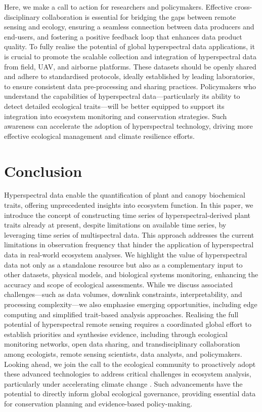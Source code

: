 \documentclass[pdflatex,sn-mathphys-num]{sn-jnl}%
\theoremstyle{thmstyleone}%
\theoremstyle{thmstyletwo}%
\theoremstyle{thmstylethree}%
\begin{document}
Here, we make a call to action for researchers and policymakers. Effective cross-disciplinary collaboration is essential for bridging the gaps between remote sensing and ecology, ensuring a seamless connection between data producers and end-users, and fostering a positive feedback loop that enhances data product quality. To fully realise the potential of global hyperspectral data applications, it is crucial to promote the scalable collection and integration of hyperspectral data from field, UAV, and airborne platforms. These datasets should be openly shared and adhere to standardised protocols, ideally established by leading laboratories, to ensure consistent data pre-processing and sharing practices. Policymakers who understand the capabilities of hyperspectral data—particularly its ability to detect detailed ecological traits—will be better equipped to support its integration into ecosystem monitoring and conservation strategies. Such awareness can accelerate the adoption of hyperspectral technology, driving more effective ecological management and climate resilience efforts.



\section{Conclusion}\label{subsec5}

Hyperspectral data enable the quantification of plant and canopy biochemical traits, offering unprecedented insights into ecosystem function. In this paper, we introduce the concept of constructing time series of hyperspectral-derived plant traits already at present, despite limitations on available time series, by leveraging time series of multispectral data. This approach addresses the current limitations in observation frequency that hinder the application of hyperspectral data in real-world ecosystem analyses. We highlight the value of hyperspectral data not only as a standalone resource but also as a complementary input to other datasets, physical models, and biological systems monitoring, enhancing the accuracy and scope of ecological assessments. While we discuss associated challenges—such as data volumes, downlink constraints, interpretability, and processing complexity—we also emphasise emerging opportunities, including edge computing and simplified trait-based analysis approaches. Realising the full potential of hyperspectral remote sensing requires a coordinated global effort to establish priorities and synthesise evidence, including through ecological monitoring networks, open data sharing, and transdisciplinary collaboration among ecologists, remote sensing scientists, data analysts, and policymakers. Looking ahead, we join the call to the ecological community to proactively adopt these advanced technologies to address critical challenges in ecosystem analysis, particularly under accelerating climate change \cite{cavender2025spectral}. Such advancements have the potential to directly inform global ecological governance, providing essential data for conservation planning and evidence-based policy-making.
\end{document}
